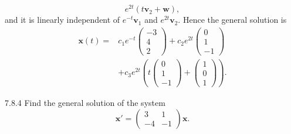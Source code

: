 \documentclass[11pt,oneside]{article}
\begin{document}
\begin{solution}
\[
    e^{2t}(t\mathbf{v}_2+\mathbf{w}),
\]
and it is linearly independent of $e^{-t}\mathbf{v}_1$ and $e^{2t}\mathbf{v}_2$. Hence the general solution is
\[
    \boxed{\begin{aligned}
        \mathbf{x}(t)={}&c_1e^{-t}\begin{pmatrix}-3\\4\\2\end{pmatrix}
        +c_2e^{2t}\begin{pmatrix}0\\1\\-1\end{pmatrix}\\
        &+c_3e^{2t}\left(
          t\begin{pmatrix}0\\1\\-1\end{pmatrix}
          +\begin{pmatrix}1\\0\\1\end{pmatrix}\right).
    \end{aligned}}
\]
\end{solution}

\begin{problem}{7.8.4}
Find the general solution of the system
\[
    \mathbf{x}'=
    \begin{pmatrix}
        3&1\\
        -4&-1
    \end{pmatrix}\mathbf{x}.
\]
\end{problem}
\end{document}
